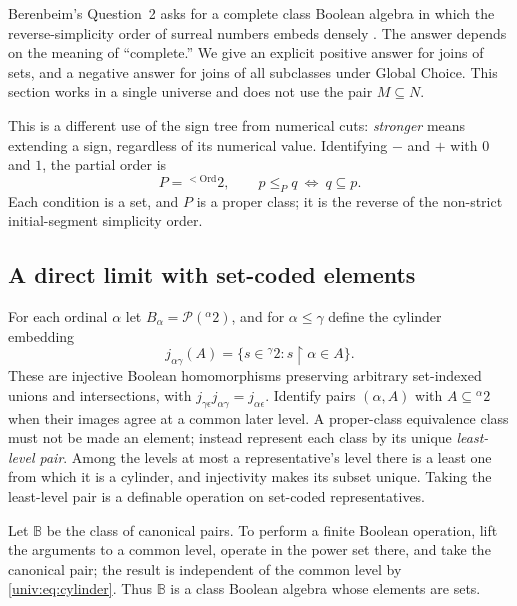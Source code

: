 \documentclass[11pt,letterpaper]{article}
\numberwithin{equation}{section}
\theoremstyle{definition}
\theoremstyle{remark}
\newcommand{\Ord}{\mathrm{Ord}}
\newcommand{\Pow}{\mathcal P}
\newcommand{\res}{\mathbin{\upharpoonright}}
\begin{document}
Berenbeim's Question~2 asks for a complete class Boolean algebra in which the
reverse-simplicity order of surreal numbers embeds densely
\cite[p.~32]{Berenbeim}. The answer depends on the meaning of ``complete.'' We
give an explicit positive answer for joins of sets, and a negative answer for
joins of all subclasses under Global Choice. This section works in a single
universe and does not use the pair $M\subseteq N$.

This is a different use of the sign tree from numerical cuts: \emph{stronger}
means extending a sign, regardless of its numerical value. Identifying $-$ and
$+$ with $0$ and $1$, the partial order is
\[
 P={}^{<\Ord}2,\qquad p\leq_P q\ \Longleftrightarrow\ q\subseteq p.
\]
Each condition is a set, and $P$ is a proper class; it is the reverse of the
non-strict initial-segment simplicity order.

\subsection{A direct limit with set-coded elements}

For each ordinal $\alpha$ let $B_\alpha=\Pow({}^\alpha2)$, and for
$\alpha\leq\gamma$ define the cylinder embedding
\begin{equation}\label{univ:eq:cylinder}
 j_{\alpha\gamma}(A)=\{s\in{}^\gamma2:s\res\alpha\in A\}.
\end{equation}
These are injective Boolean homomorphisms preserving arbitrary set-indexed
unions and intersections, with $j_{\gamma\epsilon}j_{\alpha\gamma}=j_{\alpha\epsilon}$.
Identify pairs $(\alpha,A)$ with $A\subseteq{}^\alpha2$ when their images agree
at a common later level. A proper-class equivalence class must not be made an
element; instead represent each class by its unique \emph{least-level pair}.
Among the levels at most a representative's level there is a least one from
which it is a cylinder, and injectivity makes its subset unique. Taking the
least-level pair is a definable operation on set-coded representatives.

Let $\mathbb B$ be the class of canonical pairs. To perform a finite Boolean
operation, lift the arguments to a common level, operate in the power set
there, and take the canonical pair; the result is independent of the common
level by \eqref{univ:eq:cylinder}. Thus $\mathbb B$ is a class Boolean algebra
whose elements are sets.
\end{document}
